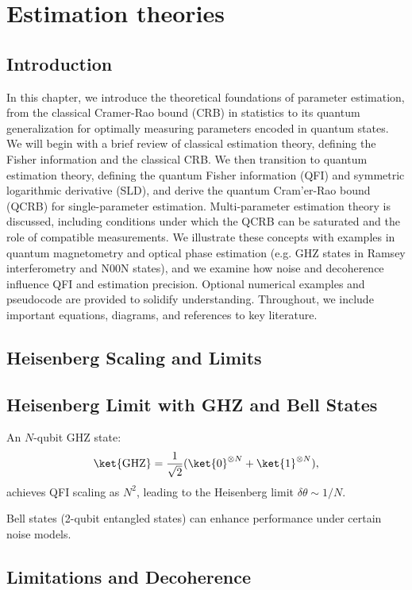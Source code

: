 \chapter{Estimation theories}

\section{Introduction}



In this chapter, we introduce the theoretical foundations
of parameter estimation, from the classical Cramer-Rao bound (CRB) in
statistics to its quantum generalization for optimally measuring
parameters encoded in quantum states. We will begin with a brief
review of classical estimation theory, defining the Fisher information
and the classical CRB. We then transition to quantum estimation
theory, defining the quantum Fisher information (QFI) and symmetric
logarithmic derivative (SLD), and derive the quantum Cram'er-Rao bound
(QCRB) for single-parameter estimation. Multi-parameter estimation
theory is discussed, including conditions under which the QCRB can be
saturated and the role of compatible measurements. We illustrate these
concepts with examples in quantum magnetometry and optical phase
estimation (e.g. GHZ states in Ramsey interferometry and N00N states),
and we examine how noise and decoherence influence QFI and estimation
precision. Optional numerical examples and pseudocode are provided to
solidify understanding. Throughout, we include important equations,
diagrams, and references to key literature.


\section{Heisenberg Scaling and Limits}

\section{Heisenberg Limit with GHZ and Bell States}

An $N$-qubit GHZ state:
\[
\ket{\text{GHZ}} = \frac{1}{\sqrt{2}}(\ket{0}^{\otimes N} + \ket{1}^{\otimes N}),
\]
achieves QFI scaling as $N^2$, leading to the Heisenberg limit $\delta\theta \sim 1/N$.

Bell states (2-qubit entangled states) can enhance performance under
certain noise models.

\section{Limitations and Decoherence}

